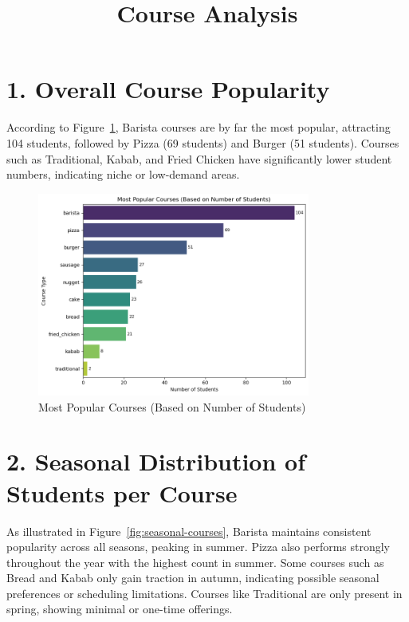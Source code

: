 \documentclass[12pt,a4paper]{article}
\title{Course Analysis}
\date{}
\begin{document}
\maketitle

\section*{1. Overall Course Popularity}
According to Figure~\ref{fig:most-popular-courses}, Barista courses are by far the most popular, attracting 104 students, followed by Pizza (69 students) and Burger (51 students). Courses such as Traditional, Kabab, and Fried Chicken have significantly lower student numbers, indicating niche or low-demand areas.

\begin{figure}[h!]
    \centering
    \includegraphics[width=0.8\textwidth]{Most Popular Courses (Based on Number of Students).png}
    \caption{Most Popular Courses (Based on Number of Students)}
    \label{fig:most-popular-courses}
\end{figure}

\section*{2. Seasonal Distribution of Students per Course}
As illustrated in Figure~\ref{fig:seasonal-courses}, Barista maintains consistent popularity across all seasons, peaking in summer.  
Pizza also performs strongly throughout the year with the highest count in summer.  
Some courses such as Bread and Kabab only gain traction in autumn, indicating possible seasonal preferences or scheduling limitations.  
Courses like Traditional are only present in spring, showing minimal or one-time offerings.
\end{document}
